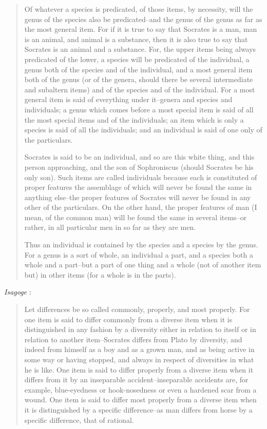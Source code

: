 \documentclass{article}
\begin{document}
\begin{quote}
Of whatever a species is predicated, of those items, by necessity, will the genus of the species also be predicated--and the genus of the genus as far as the most general item. For if it is true to say that Socrates is a man, man is an animal, and animal is a substance, then it is also true to say that Socrates is an animal and a substance. For, the upper items being always predicated of the lower, a species will be predicated of the individual, a genus both of the species and of the individual, and a most general item both of the genus (or of the genera, should there be several intermediate and subaltern items) and of the species and of the individual. For a most general item is said of everything under it--genera and species and individuals; a genus which comes before a most special item is said of all the most special items and of the individuals; an item which is only a species is said of all the individuals; and an individual is said of one only of the particulars.

Socrates is said to be an individual, and so are this white thing, and this person approaching, and the son of Sophroniscus (should Socrates be his only son). Such items are called individuals because each is constituted of proper features the assemblage of which will never be found the same in anything else--the proper features of Socrates will never be found in any other of the particulars. On the other hand, the proper features of man (I mean, of the common man) will be found the same in several items--or rather, in all particular men in so far as they are men.

Thus an individual is contained by the species and a species by the genus. For a genus is a sort of whole, an individual a part, and a species both a whole and a part--but a part of one thing and a whole (not of another item but) in other items (for a whole is in the parts).
\end{quote}

{\em Isagoge} \cite[pp.~8--9, \S 3]{isagoge}:

\begin{quote}
Let differences be so called commonly, properly, and most properly. For one item is said to differ commonly from a diverse item when it is distinguished in any fashion by a diversity either in relation to itself or
in relation to another item--Socrates differs from Plato by diversity, and indeed from himself as a boy and as a grown man, and as being active in some way or having stopped, and always in respect of diversities in what he is like. One item is said to differ properly from a diverse item when it differs from it by an inseparable accident--inseparable accidents are, for example, blue-eyedness or hook-nosedness or even a hardened scar from a wound. One item is said to differ most properly from a diverse item when it is distinguished by a specific difference--as man differs from horse by a specific difference, that of rational.
\end{quote}
\end{document}
